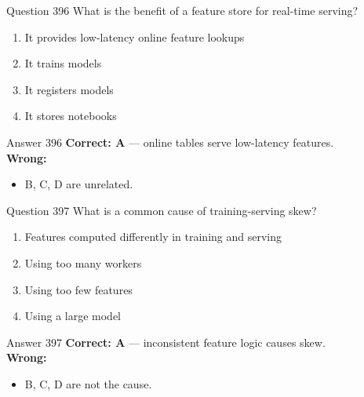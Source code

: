 \documentclass[aspectratio=169,11pt]{beamer}
\begin{document}
	\begin{frame}{Question 396}
		What is the benefit of a feature store for real-time serving?
		\begin{enumerate}[label=\Alph*.]
			\item It provides low-latency online feature lookups
			\item It trains models
			\item It registers models
			\item It stores notebooks
		\end{enumerate}
	\end{frame}
	\begin{frame}{Answer 396}
		\textbf{Correct: A} --- online tables serve low-latency features.\\
		\vspace{0.5em}
		\textbf{Wrong:}
		\begin{itemize}
			\item B, C, D are unrelated.
		\end{itemize}
	\end{frame}
	
	\begin{frame}{Question 397}
		What is a common cause of training-serving skew?
		\begin{enumerate}[label=\Alph*.]
			\item Features computed differently in training and serving
			\item Using too many workers
			\item Using too few features
			\item Using a large model
		\end{enumerate}
	\end{frame}
	\begin{frame}{Answer 397}
		\textbf{Correct: A} --- inconsistent feature logic causes skew.\\
		\vspace{0.5em}
		\textbf{Wrong:}
		\begin{itemize}
			\item B, C, D are not the cause.
		\end{itemize}
	\end{frame}
	
\end{document}
